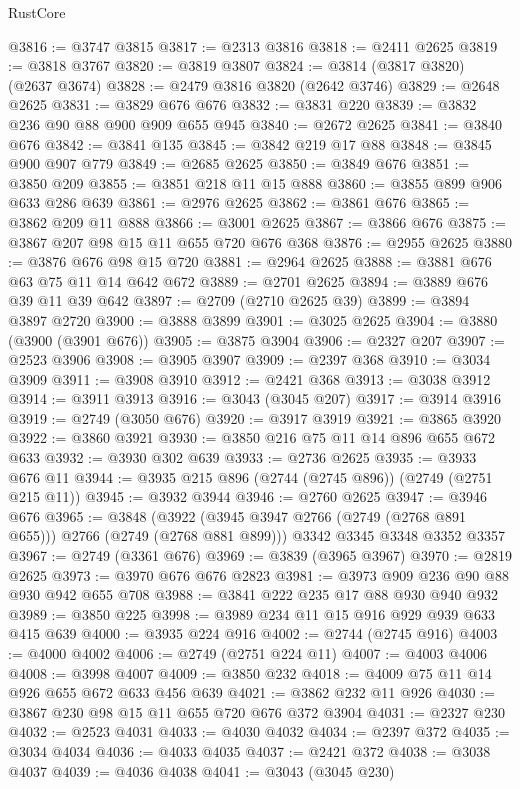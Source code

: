 \begin{lexlean}{RustCore}
\begin{coremodule}
@3816 := @3747 @3815
@3817 := @2313 @3816
@3818 := @2411 @2625
@3819 := @3818 @3767
@3820 := @3819 @3807
@3824 := @3814 (@3817 @3820) (@2637 @3674)
@3828 := @2479 @3816 @3820 (@2642 @3746)
@3829 := @2648 @2625
@3831 := @3829 @676 @676
@3832 := @3831 @220
@3839 := @3832 @236 @90 @88 @900 @909 @655 @945
@3840 := @2672 @2625
@3841 := @3840 @676
@3842 := @3841 @135
@3845 := @3842 @219 @17 @88
@3848 := @3845 @900 @907 @779
@3849 := @2685 @2625
@3850 := @3849 @676
@3851 := @3850 @209
@3855 := @3851 @218 @11 @15 @888
@3860 := @3855 @899 @906 @633 @286 @639
@3861 := @2976 @2625
@3862 := @3861 @676
@3865 := @3862 @209 @11 @888
@3866 := @3001 @2625
@3867 := @3866 @676
@3875 := @3867 @207 @98 @15 @11 @655 @720 @676 @368
@3876 := @2955 @2625
@3880 := @3876 @676 @98 @15 @720
@3881 := @2964 @2625
@3888 := @3881 @676 @63 @75 @11 @14 @642 @672
@3889 := @2701 @2625
@3894 := @3889 @676 @39 @11 @39 @642
@3897 := @2709 (@2710 @2625 @39)
@3899 := @3894 @3897 @2720
@3900 := @3888 @3899
@3901 := @3025 @2625
@3904 := @3880 (@3900 (@3901 @676))
@3905 := @3875 @3904
@3906 := @2327 @207
@3907 := @2523 @3906
@3908 := @3905 @3907
@3909 := @2397 @368
@3910 := @3034 @3909
@3911 := @3908 @3910
@3912 := @2421 @368
@3913 := @3038 @3912
@3914 := @3911 @3913
@3916 := @3043 (@3045 @207)
@3917 := @3914 @3916
@3919 := @2749 (@3050 @676)
@3920 := @3917 @3919
@3921 := @3865 @3920
@3922 := @3860 @3921
@3930 := @3850 @216 @75 @11 @14 @896 @655 @672 @633
@3932 := @3930 @302 @639
@3933 := @2736 @2625
@3935 := @3933 @676 @11
@3944 := @3935 @215 @896 (@2744 (@2745 @896)) (@2749 (@2751 @215 @11))
@3945 := @3932 @3944
@3946 := @2760 @2625
@3947 := @3946 @676
@3965 := @3848
    (@3922 (@3945 @3947 @2766 (@2749 (@2768 @891 @655))) @2766 (@2749 (@2768 @881 @899)))
    @3342
    @3345
    @3348
    @3352
    @3357
@3967 := @2749 (@3361 @676)
@3969 := @3839 (@3965 @3967)
@3970 := @2819 @2625
@3973 := @3970 @676 @676 @2823
@3981 := @3973 @909 @236 @90 @88 @930 @942 @655 @708
@3988 := @3841 @222 @235 @17 @88 @930 @940 @932
@3989 := @3850 @225
@3998 := @3989 @234 @11 @15 @916 @929 @939 @633 @415 @639
@4000 := @3935 @224 @916
@4002 := @2744 (@2745 @916)
@4003 := @4000 @4002
@4006 := @2749 (@2751 @224 @11)
@4007 := @4003 @4006
@4008 := @3998 @4007
@4009 := @3850 @232
@4018 := @4009 @75 @11 @14 @926 @655 @672 @633 @456 @639
@4021 := @3862 @232 @11 @926
@4030 := @3867 @230 @98 @15 @11 @655 @720 @676 @372 @3904
@4031 := @2327 @230
@4032 := @2523 @4031
@4033 := @4030 @4032
@4034 := @2397 @372
@4035 := @3034 @4034
@4036 := @4033 @4035
@4037 := @2421 @372
@4038 := @3038 @4037
@4039 := @4036 @4038
@4041 := @3043 (@3045 @230)

\end{coremodule}
\end{lexlean}
